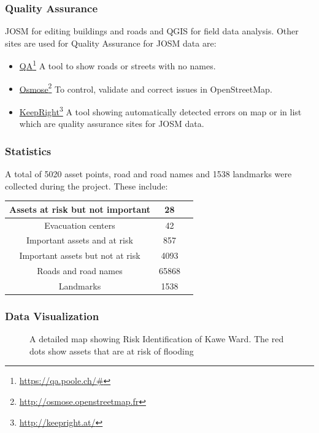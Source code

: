 \documentclass[a4paper,12pt,twoside]{article}
\begin{document}
\subsubsection{Quality Assurance}
JOSM for editing buildings and roads and QGIS for field data analysis. Other sites are used for Quality Assurance for JOSM data are:
\begin{itemize}
    \item \href{https://qa.poole.ch/\#}{QA}\footnote{\url{https://qa.poole.ch/\#}}
    A tool to show roads or streets with no names.

    \item \href{http://osmose.openstreetmap.fr}{Osmose}\footnote{\url{http://osmose.openstreetmap.fr}}
    To  control, validate and correct issues in OpenStreetMap.

    \item \href{http://keepright.at/}{KeepRight}\footnote{\url{http://keepright.at/}}
    A tool showing automatically detected errors on map or in list which are quality assurance sites for JOSM data.

\end{itemize}

\subsubsection{Statistics}
A total of 5020 asset points, road and road names and 1538 landmarks were collected during the project. These include:
\begin{center}
\begin{tabular}{ |c|c|c| }
 \hline
 Assets at risk but not important & 28 \\ 
 \hline
 Evacuation centers & 42 \\ 
 \hline
 Important assets and at risk & 857 \\
 \hline
 Important assets but not at risk & 4093 \\
 \hline
 Roads and road names & 65868 \\
 \hline
 Landmarks & 1538 \\
 \hline 
\end{tabular}
\end{center}

\subsubsection{Data Visualization}
\begin{figure}[h]
{\color{RHgreen}\caption{A detailed map showing Risk Identification of Kawe Ward. The red dots show assets that are at risk of flooding}}
 \centering
\end{figure}
\end{document}
